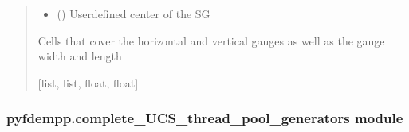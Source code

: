 \documentclass[letterpaper,10pt,english]{sphinxmanual}
\begin{document}
\begin{fulllineitems}
\begin{quote}
\begin{description}
\begin{itemize}
\item {} 
\sphinxAtStartPar
{} (\sphinxstyleliteralemphasis{\sphinxupquote{{[}}}\sphinxstyleliteralemphasis{\sphinxupquote{, }}\sphinxstyleliteralemphasis{\sphinxupquote{, }}\sphinxstyleliteralemphasis{\sphinxupquote{{]}}}) \textendash{} User\sphinxhyphen{}defined center of the SG

\end{itemize}

\sphinxAtStartPar
Cells that cover the horizontal and vertical gauges as well as the gauge width and length

\sphinxAtStartPar
{[}list, list, float, float{]}

\end{description}\end{quote}

\end{fulllineitems}



\subsubsection{pyfdempp.complete\_UCS\_thread\_pool\_generators module}
\label{\detokenize{pyfdempp:module-pyfdempp.complete_UCS_thread_pool_generators}}\label{\detokenize{pyfdempp:pyfdempp-complete-ucs-thread-pool-generators-module}}

\begin{fulllineitems}
\label{\detokenize{pyfdempp:pyfdempp.complete_UCS_thread_pool_generators.check_loading_direction}}
\pysigstartsignatures
{}
\pysigstopsignatures
\end{fulllineitems}
\end{document}

